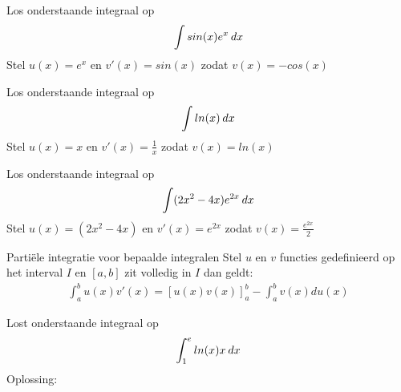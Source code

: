 \begin{exercise}
	\label{sec:partiele-herhaling}
	Los onderstaande integraal op
	\[ \int  sin(x) e^x \hspace{2pt}dx \]
	Stel $u(x) = e^x$ en $v'(x) = sin(x)$ zodat $v(x) = -cos(x)$
	\iftoggle{solution}{%
		\begin{eqnarray}
		\int  sin(x) e^x \dx = & -e^x cos(x) + \int e^xcos(x) \\
		& -e^x cos(x) + \int e^x d sin(x) \\
		& -e^x cos(x) + e^x sin(x) 	- \int  sin(x) e^x \dx		
		\end{eqnarray}
		We komen dus in het linkerlid en rechterlid hetzelfde tegen. Brengt men deze term uit het rechterlid naar het linkerlid krijg je 
				\begin{eqnarray}
		2 \int  sin(x) e^x \dx = & e^x( sin(x) - cos(x)) \\	
		\int  sin(x) e^x \dx = & \frac{1}{2}(e^x( sin(x) - cos(x)))
		\end{eqnarray} 
	}{%
	}	
	
\end{exercise}

\begin{exercise}
	Los onderstaande integraal op
	\[ \int  ln(x) \hspace{2pt}dx \]
	Stel $u(x) = x$ en $v'(x) = \frac{1}{x}$ zodat $v(x) = ln(x)$
	\iftoggle{solution}{%
		\begin{eqnarray}
		\int  ln(x) \dx = & xln(x)- \int \frac{x}{x} \dx \\
		& xln(x) - \int \dx = xln(x)-x+C \in  \mathbb{R}  
		\end{eqnarray}
	}{%
	}	
\end{exercise}

\begin{exercise}
	Los onderstaande integraal op
	\[ \int  (2x^2 - 4x)e^{2x} \hspace{2pt}dx \]
Stel $u(x) = (2x^2 -4x)$ en $v'(x) = e^{2x}$ zodat $v(x) = \frac{e^{2x}}{2}$
	\iftoggle{solution}{%
		\begin{eqnarray}
		\int  (2x^2 - 4x)e^{2x} \dx = &(x^2 -4x)\frac{e^{2x}}{2} - \int \frac{e^{2x}}{2} * (4x -4) \dx \\
		& (x^2 - 3x  + \frac{3}{2}e^{2x} + C \in  \mathbb{R}  
		\end{eqnarray}
	}{%
	}	
\end{exercise}

\begin{theorem}{Parti\"ele integratie voor bepaalde integralen}
	Stel $u$ en $v$ functies gedefinieerd op het interval $I$ en $[a,b]$ zit volledig in $I$ dan geldt:
	\begin{eqnarray}
	\int_a^b u(x)v'(x) = [u(x)v(x)]^b_a - \int_a^b v(x)du(x)
	\end{eqnarray} 
\end{theorem}

\begin{exercise}
	Lost onderstaande integraal op
	\[\int_1^e ln(x) x \hspace{2pt}dx \]
	Oplossing:
	\iftoggle{solution}{%
		\[ \int_1^e ln(x) d\frac{x^2}{2} = \frac{e^2}{4} + \frac{1}{4} \]
	}{}	
\end{exercise}

\


